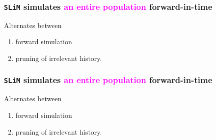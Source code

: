 \documentclass[11pt, mathserif, aspectratio=169]{beamer}
\newcommand{\magenta}[1]{\textcolor{magenta}{#1}}
\begin{document}
\begin{frame}
\frametitle{\texttt{SLiM} simulates \magenta{an entire population} forward-in-time}
\begin{minipage}{.58\textwidth}

\end{minipage}\hfill
\begin{minipage}{.4\textwidth}
Alternates between
\begin{enumerate}
\item forward simulation
\item pruning of irrelevant history.
\end{enumerate}
\end{minipage}
\end{frame}

%

\begin{frame}
\frametitle{\texttt{SLiM} simulates \magenta{an entire population} forward-in-time}
\begin{minipage}{.58\textwidth}

\end{minipage}\hfill
\begin{minipage}{.4\textwidth}
Alternates between
\begin{enumerate}
\item forward simulation
\item pruning of irrelevant history.
\end{enumerate}
\end{minipage}
\end{frame}

%
\end{document}

